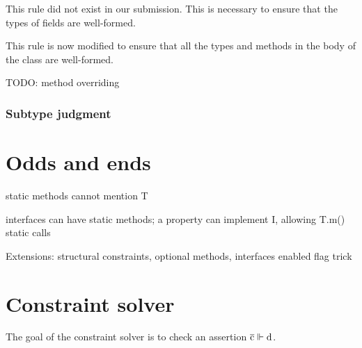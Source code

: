\documentclass[preprint,nocopyrightspace,9pt]{sigplanconf}
\begin{document}
This rule did not exist in our submission. This is necessary to ensure
that the types of fields are well-formed.



This rule is now modified to ensure that all the types and methods in
the body of the class are well-formed.


TODO: method overriding


\subsubsection{
        Subtype judgment
}



\section{Odds and ends}

static methods cannot mention T

interfaces can have static methods; a property can implement I,
allowing T.m() static calls

Extensions: structural constraints, optional methods, interfaces
        enabled flag trick


\section{Constraint solver}

The goal of the constraint solver is 
to check an assertion $\xbar{c} \vdashC \Xcd{d}$.
\end{document}
